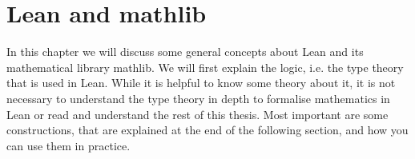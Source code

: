 \chapter{Lean and mathlib}

In this chapter we will discuss some general concepts about Lean and its mathematical library mathlib. 
We will first explain the logic, i.e. the type theory that is used in Lean. 
While it is helpful to know some theory about it, it is not necessary to understand the type theory in depth to formalise mathematics in Lean or read and understand the rest of this thesis. 
Most important are some constructions, that are explained at the end of the following section, and how you can use them in practice.



